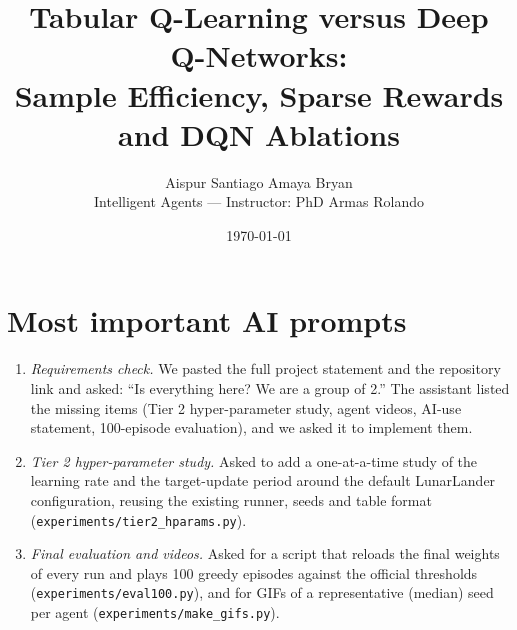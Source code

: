 \documentclass[10pt,twocolumn]{article}
\title{\vspace{-1.2em}Tabular Q-Learning versus Deep Q-Networks:\\ Sample Efficiency, Sparse Rewards and DQN Ablations}
\author{Aispur Santiago \quad Amaya Bryan\\[0.2em]
\small Intelligent Agents --- Instructor: PhD Armas Rolando}
\date{\today}
\begin{document}
\maketitle






\appendix
\section{Most important AI prompts}
\label{app:prompts}
\small
\begin{enumerate}
\item \emph{Requirements check.} We pasted the full project statement and the repository link and asked:
``Is everything here? We are a group of 2.'' The assistant listed the missing items (Tier 2
hyper-parameter study, agent videos, AI-use statement, 100-episode evaluation), and we asked it to implement them.
\item \emph{Tier 2 hyper-parameter study.} Asked to add a one-at-a-time study of the learning rate and the
target-update period around the default LunarLander configuration, reusing the existing runner, seeds
and table format (\texttt{experiments/tier2\_hparams.py}).
\item \emph{Final evaluation and videos.} Asked for a script that reloads the final weights of every run and
plays 100 greedy episodes against the official thresholds (\texttt{experiments/eval100.py}), and for
GIFs of a representative (median) seed per agent (\texttt{experiments/make\_gifs.py}).
\end{enumerate}
\end{document}
